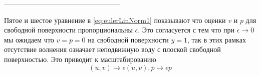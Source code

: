 --------------------------------------------------


Пятое и шестое уравнение в \eqref{eq:eulerLinNorm1} показывают что оценки $v$ и $p$ для свободной поверхности пропорциональны $\epsilon$. Это согласуется с тем что  при $\epsilon\rightarrow 0$ мы ожидаем что $v = p = 0$ на свободной поверхности $y=1$, так в этих рамках отсутствие волнения означает неподвижную воду с плоской свободной поверхностью. Это приводит к масштабированию
\begin{equation}\label{eq:scaling}
   (u, v)\mapsto\epsilon(u, v), p\mapsto\epsilon p
\end{equation}


